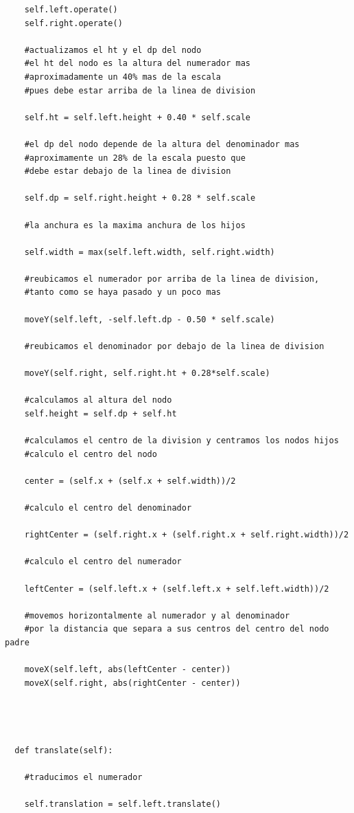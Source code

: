 \begin{verbatim}
    self.left.operate()
    self.right.operate()
    
    #actualizamos el ht y el dp del nodo
    #el ht del nodo es la altura del numerador mas 
    #aproximadamente un 40% mas de la escala 
    #pues debe estar arriba de la linea de division

    self.ht = self.left.height + 0.40 * self.scale

    #el dp del nodo depende de la altura del denominador mas
    #aproximamente un 28% de la escala puesto que 
    #debe estar debajo de la linea de division

    self.dp = self.right.height + 0.28 * self.scale
    
    #la anchura es la maxima anchura de los hijos

    self.width = max(self.left.width, self.right.width)

    #reubicamos el numerador por arriba de la linea de division,
    #tanto como se haya pasado y un poco mas

    moveY(self.left, -self.left.dp - 0.50 * self.scale)
    
    #reubicamos el denominador por debajo de la linea de division

    moveY(self.right, self.right.ht + 0.28*self.scale)

    #calculamos al altura del nodo
    self.height = self.dp + self.ht

    #calculamos el centro de la division y centramos los nodos hijos
    #calculo el centro del nodo

    center = (self.x + (self.x + self.width))/2

    #calculo el centro del denominador

    rightCenter = (self.right.x + (self.right.x + self.right.width))/2

    #calculo el centro del numerador

    leftCenter = (self.left.x + (self.left.x + self.left.width))/2

    #movemos horizontalmente al numerador y al denominador
    #por la distancia que separa a sus centros del centro del nodo padre

    moveX(self.left, abs(leftCenter - center))
    moveX(self.right, abs(rightCenter - center))


      
    
  def translate(self):

    #traducimos el numerador

    self.translation = self.left.translate()


\end{verbatim}

